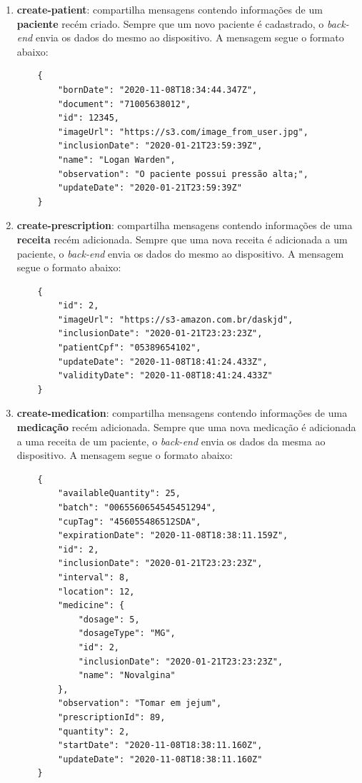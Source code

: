 \begin{enumerate}
    \item \textbf{create-patient}: compartilha mensagens contendo informações de um \textbf{paciente} recém criado. Sempre que um novo paciente é cadastrado, o \textit{back-end} envia os dados do mesmo ao dispositivo. A mensagem segue o formato abaixo:
    
        \begin{verbatim}
    {
        "bornDate": "2020-11-08T18:34:44.347Z",
        "document": "71005638012",
        "id": 12345,
        "imageUrl": "https://s3.com/image_from_user.jpg",
        "inclusionDate": "2020-01-21T23:59:39Z",
        "name": "Logan Warden",
        "observation": "O paciente possui pressão alta;",
        "updateDate": "2020-01-21T23:59:39Z"
    }
    \end{verbatim}
    
    \item \textbf{create-prescription}: compartilha mensagens contendo informações de uma \textbf{receita} recém adicionada. Sempre que uma nova receita é adicionada a um paciente, o \textit{back-end} envia os dados do mesmo ao dispositivo. A mensagem segue o formato abaixo:
    
        \begin{verbatim}
    {
        "id": 2,
        "imageUrl": "https://s3-amazon.com.br/daskjd",
        "inclusionDate": "2020-01-21T23:23:23Z",
        "patientCpf": "05389654102",
        "updateDate": "2020-11-08T18:41:24.433Z",
        "validityDate": "2020-11-08T18:41:24.433Z"
    }
    \end{verbatim}
    
    \item \textbf{create-medication}: compartilha mensagens contendo informações de uma \textbf{medicação} recém adicionada. Sempre que uma nova medicação é adicionada a uma receita de um paciente, o \textit{back-end} envia os dados da mesma ao dispositivo. A mensagem segue o formato abaixo:
    
        \begin{verbatim}
    {
        "availableQuantity": 25,
        "batch": "0065560654545451294",
        "cupTag": "456055486512SDA",
        "expirationDate": "2020-11-08T18:38:11.159Z",
        "id": 2,
        "inclusionDate": "2020-01-21T23:23:23Z",
        "interval": 8,
        "location": 12,
        "medicine": {
            "dosage": 5,
            "dosageType": "MG",
            "id": 2,
            "inclusionDate": "2020-01-21T23:23:23Z",
            "name": "Novalgina"
        },
        "observation": "Tomar em jejum",
        "prescriptionId": 89,
        "quantity": 2,
        "startDate": "2020-11-08T18:38:11.160Z",
        "updateDate": "2020-11-08T18:38:11.160Z"
    }
    \end{verbatim}


\end{enumerate}
